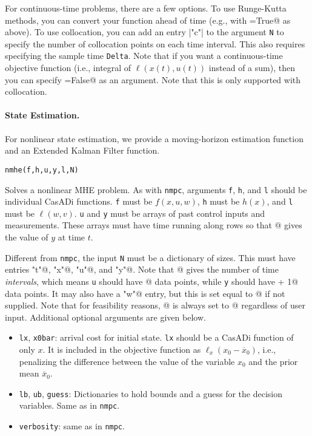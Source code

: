 \documentclass{article}
\providecommand{\lstinline}{}
\newcommand{\funcname}[2][.25em]{\vspace{#1}\noindent\texttt{#2}\nopagebreak\vspace{#1}}
\newcommand{\casadi}{CasADi}
\begin{document}
\begin{multicols}{2}
For continuous-time problems, there are a few options.
To use Runge-Kutta methods, you can convert your function ahead of time (e.g., with =True@ as above).
To use collocation, you can add an entry \lstinline|"c"| to the argument \texttt{N} to specify the number of collocation points on each time interval.
This also requires specifying the sample time \texttt{Delta}.
Note that if you want a continuous-time objective function (i.e., integral of $\ell(x(t),u(t))$ instead of a sum), then you can specify \lstinline@discretel=False@ as an argument.
Note that this is only supported with collocation.

\paragraph*{State Estimation.}

For nonlinear state estimation, we provide a moving-horizon estimation function and an Extended Kalman Filter function.

\funcname{nmhe(f,h,u,y,l,N)}

Solves a nonlinear MHE problem.
As with \texttt{nmpc}, arguments \texttt{f}, \texttt{h}, and \texttt{l} should be individual \casadi{} functions.
\texttt{f} must be $f(x,u,w)$, \texttt{h} must be $h(x)$, and \texttt{l} must be $\ell(w,v)$.
\texttt{u} and \texttt{y} must be arrays of past control inputs and measurements.
These arrays must have time running along rows so that \lstinline@y[t,:]@ gives the value of $y$ at time $t$.

Different from \texttt{nmpc}, the input \texttt{N} must be a dictionary of sizes.
This must have entries \lstinline@"t"@, \lstinline@"x"@, \lstinline@"u"@, and \lstinline@"y"@.
Note that \lstinline@N["t"]@ gives the number of time \emph{intervals}, which means \texttt{u} should have \lstinline@N["t"]@ data points, while \texttt{y} should have \lstinline@N["t"] + 1@ data points.
It may also have a \lstinline@"w"@ entry, but this is set equal to \lstinline@N["x"]@ if not supplied.
Note that for feasibility reasons, \lstinline@N["v"]@ is always set to \lstinline@N["y"]@ regardless of user input. Additional optional arguments are given below.

\begin{itemize}[noitemsep,nolistsep]
    \item \texttt{lx}, \texttt{x0bar}: arrival cost for initial state.
    \texttt{lx} should be a \casadi{} function of only $x$.
    It is included in the objective function as $\ell_x(x_0 - \overline{x}_0)$, i.e., penalizing the difference between the value of the variable $x_0$ and the prior mean $\overline{x}_0$.
    \item \texttt{lb}, \texttt{ub}, \texttt{guess}: Dictionaries to hold bounds and a guess for the decision variables.
    Same as in \texttt{nmpc}.
    \item \texttt{verbosity}: same as in \texttt{nmpc}.
\end{itemize}


\end{multicols}
\end{document}

